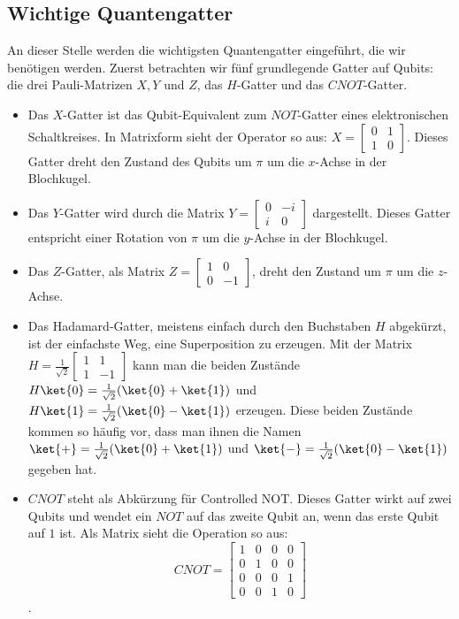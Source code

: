 \subsection{Wichtige Quantengatter}
An dieser Stelle werden die wichtigsten Quantengatter eingeführt, die wir benötigen werden. Zuerst betrachten wir fünf grundlegende Gatter auf Qubits: die drei Pauli-Matrizen $X, Y$ und $Z$, das $H$-Gatter und das $CNOT$-Gatter.
\begin{itemize}
    \item Das $X$-Gatter ist das Qubit-Equivalent zum $NOT$-Gatter eines elektronischen Schaltkreises. In Matrixform sieht der Operator so aus: $ X = \begin{bmatrix}0 & 1 \\ 1 & 0\end{bmatrix}$. Dieses Gatter dreht den Zustand des Qubits um $\pi$ um die $x$-Achse in der Blochkugel.
    \item Das $Y$-Gatter wird durch die Matrix $Y = \begin{bmatrix}0 & -i \\ i & 0\end{bmatrix}$ dargestellt. Dieses Gatter entspricht einer Rotation von $\pi$ um die $y$-Achse in der Blochkugel.
    \item Das $Z$-Gatter, als Matrix $Z = \begin{bmatrix}1 & 0 \\ 0 & -1\end{bmatrix}$, dreht den Zustand um $\pi$ um die $z$-Achse.
    \item Das Hadamard-Gatter, meistens einfach durch den Buchstaben $H$ abgekürzt, ist der einfachste Weg, eine Superposition zu erzeugen. Mit der Matrix $H = \frac{1}{\sqrt{2}}\begin{bmatrix}1 & 1 \\ 1 & -1\end{bmatrix}$ kann man die beiden Zustände $H\ket{0} = \frac{1}{\sqrt{2}}(\ket{0} + \ket{1})$ und $H\ket{1} = \frac{1}{\sqrt{2}}(\ket{0} - \ket{1})$ erzeugen. Diese beiden Zustände kommen so häufig vor, dass man ihnen die Namen $\ket{+} = \frac{1}{\sqrt{2}}(\ket{0} + \ket{1})$ und $\ket{-} = \frac{1}{\sqrt{2}}(\ket{0} - \ket{1})$ gegeben hat.
    \item $CNOT$ steht als Abkürzung für \grqq Controlled NOT\grqq. Dieses Gatter wirkt auf zwei Qubits und wendet ein $NOT$ auf das zweite Qubit an, wenn das erste Qubit auf $1$ ist. Als Matrix sieht die Operation so aus: $$CNOT = \begin{bmatrix}1 & 0 & 0 & 0 \\ 0 & 1 & 0 & 0 \\ 0 & 0 & 0 & 1 \\ 0 & 0 & 1 & 0\end{bmatrix}$$.
\end{itemize}

